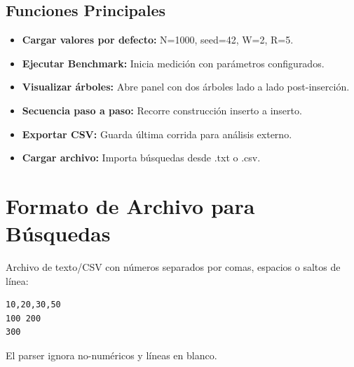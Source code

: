 \documentclass[12pt,a4paper]{article}
\begin{document}
\subsection{Funciones Principales}

\begin{itemize}
    \item \textbf{Cargar valores por defecto:} N=1000, seed=42, W=2, R=5.
    \item \textbf{Ejecutar Benchmark:} Inicia medición con parámetros configurados.
    \item \textbf{Visualizar árboles:} Abre panel con dos árboles lado a lado post-inserción.
    \item \textbf{Secuencia paso a paso:} Recorre construcción inserto a inserto.
    \item \textbf{Exportar CSV:} Guarda última corrida para análisis externo.
    \item \textbf{Cargar archivo:} Importa búsquedas desde .txt o .csv.
\end{itemize}

\section{Formato de Archivo para Búsquedas}

Archivo de texto/CSV con números separados por comas, espacios o saltos de línea:

\begin{lstlisting}
10,20,30,50
100 200
300
\end{lstlisting}

El parser ignora no-numéricos y líneas en blanco.
\end{document}
